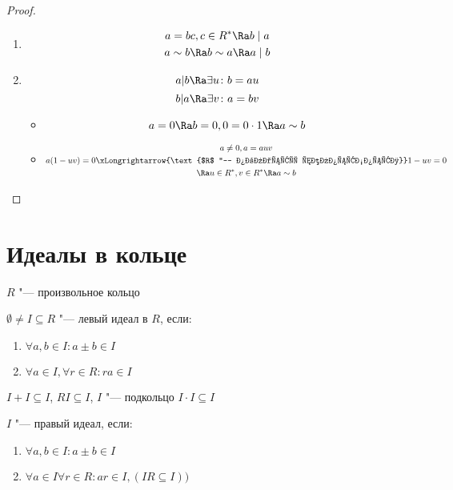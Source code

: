 \begin{proof}
	\begin{enumerate}
		\item \begin{gather*}
			a = bc, c \in R^* \Ra b \mid a \\
			a \sim b \Ra b \sim a \Ra a \mid b
		\end{gather*}
		\item 
		$$a|b \Ra \exists u \colon b = au$$
		$$b|a \Ra \exists v \colon a = bv$$
		\begin{itemize}
			\item \[ a = 0 \Ra b = 0, 0  = 0 \cdot 1 \Ra a \sim b \]
			\item \begin{gather*}
				a \ne 0, a = auv \\
				a(1 - uv) = 0 \xLongrightarrow{\text{$R$ "--- область целостности}} 1 - uv = 0 \\
				\Ra u \in R^*, v \in R^* \Ra a \sim b
			\end{gather*}
		\end{itemize}
	\end{enumerate}
\end{proof}

\section{Идеалы в кольце}
$R$ "--- произвольное кольцо

\begin{Def}
	$\emptyset \ne I \subseteq R$ "--- левый идеал в $R$, если:
	\begin{enumerate}
		\item $ \forall a, b \in I \colon a \pm b \in I $
		\item $ \forall a \in I, \forall r \in R \colon ra \in I $
	\end{enumerate}
\end{Def}

\begin{Rem}
$I + I \subseteq I$, $RI \subseteq I$, $I$ "--- подкольцо $I \cdot I \subseteq I$
\end{Rem}

\begin{Def}
	$I$ "--- правый идеал, если:
	\begin{enumerate}
		\item $ \forall a, b \in I \colon a \pm b \in I $
		\item $ \forall a \in I \forall r \in R \colon ar \in I, (IR \subseteq I)) $
	\end{enumerate}
\end{Def}


